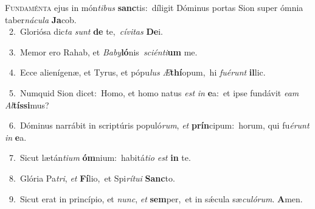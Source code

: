 \lettrine{\initial\textcolor{\initialcolor}{F}}{undaménta} ejus in món\-\textit{ti}\-\textit{bus} \textbf{sanc}\-tis:~\star díligit Dóminus portas Sion super ómnia taber\-\textit{ná}\-\textit{cu}\textit{la} \textbf{Ja}\-cob.\\
{\numbfont\textcolor{\numbcolor}{~2.}}~Gloriósa dic\textit{ta} \textit{sunt} \textbf{de} te,~\star \textit{cí}\-\textit{vi}\textit{tas} \textbf{De}\-i.\par
{\numbfont\textcolor{\numbcolor}{~3.}}~Memor ero Rahab, et \textit{Ba}\-\textit{by}\textbf{ló}nis~\star \textit{sci}\-\textit{én}\textit{ti}\textbf{um} me.\par
{\numbfont\textcolor{\numbcolor}{~4.}}~Ecce alienígenæ, et Tyrus, et pópu\textit{lus} \textit{Æ}\-\textbf{thí}opum,~\star hi \textit{fu}\-\textit{é}\textit{runt} \textbf{il}\-lic.\par
{\numbfont\textcolor{\numbcolor}{~5.}}~Numquid Sion dicet:~\dagger Homo, et homo natus \textit{est} \textit{in} \textbf{e}\-a:~\star et ipse fundávit \textit{e}\-\textit{am} \textit{Al}\-\textbf{tís}\textbf{si}mus?\par
{\numbfont\textcolor{\numbcolor}{~6.}}~Dóminus narrábit in scriptúris populó\-\textit{rum}\-, \textit{et} \textbf{prín}\-cipum:~\star horum, qui fu\-\textit{é}\-\textit{runt} \textit{in} \textbf{e}\-a.\par
{\numbfont\textcolor{\numbcolor}{~7.}}~Sicut lætán\-\textit{ti}\-\textit{um} \textbf{óm}\-nium:~\star habitá\-\textit{ti}\-\textit{o} \textit{est} \textbf{in} te.\par
{\numbfont\textcolor{\numbcolor}{~8.}}~Glória Pa\-\textit{tri}\-, \textit{et} \textbf{Fí}\-lio,~\star et Spi\-\textit{rí}\-\textit{tu}\textit{i} \textbf{Sanc}\-to.\par
{\numbfont\textcolor{\numbcolor}{~9.}}~Sicut erat in princípio, et \textit{nunc}\-, \textit{et} \textbf{sem}\-per,~\star et in sǽcula sæ\-\textit{cu}\-\textit{ló}\textit{rum}. \textbf{A}\-men.\par
